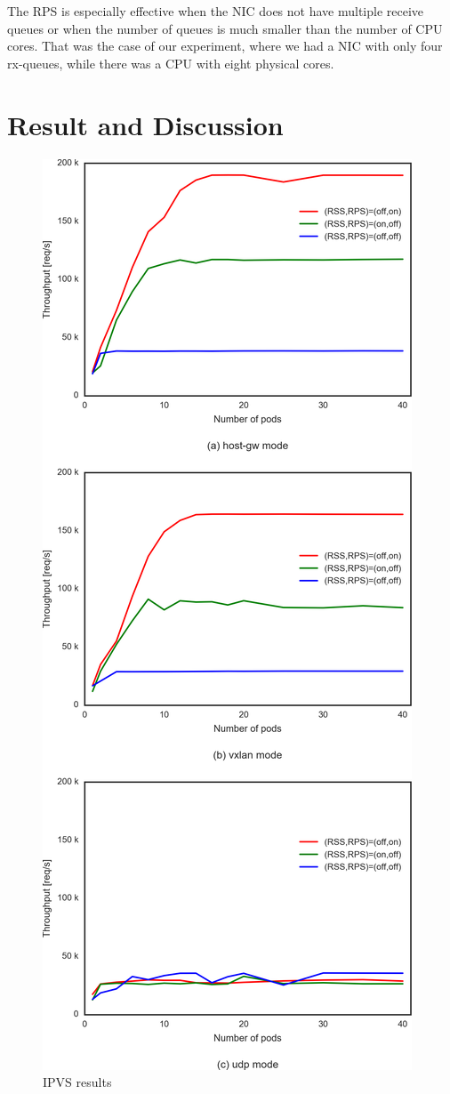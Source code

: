 The RPS is especially effective when the NIC does not have multiple receive queues or when the number of queues is 
much smaller than the number of CPU cores. 
That was the case of our experiment, where we had a NIC with only four rx-queues, 
while there was a CPU with eight physical cores.

\section{Result and Discussion}\label{Result and Discussion}

\begin{figure}
\includegraphics[width=\columnwidth]{Figs/ipvs_3figs}
\caption{IPVS results}
\label{fig:IPVS3figs}
\end{figure}

